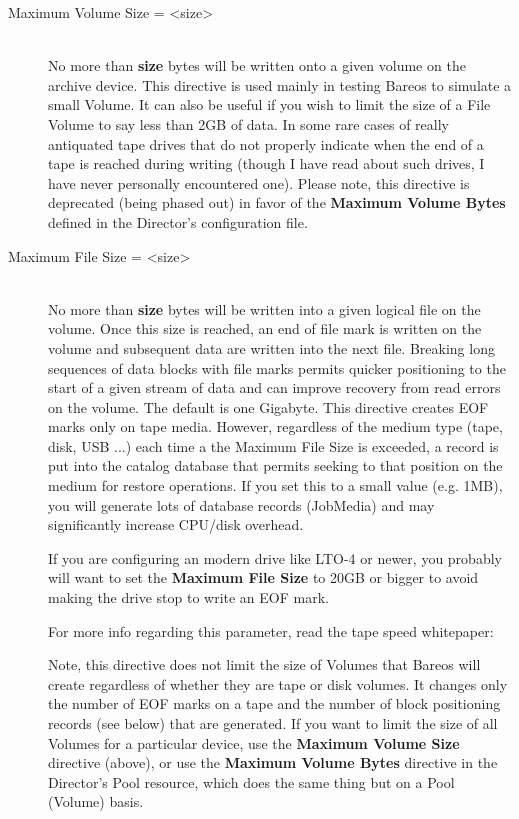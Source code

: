 \begin{description}
\item [Maximum Volume Size = {\textless}size{\textgreater}] \hfill \\
No more than {\bf size} bytes will be written onto a given volume on the
archive device.  This directive is used mainly in testing Bareos to
simulate a small Volume.  It can also be useful if you wish to limit the
size of a File Volume to say less than 2GB of data.  In some rare cases
of really antiquated tape drives that do not properly indicate when the
end of a tape is reached during writing (though I have read about such
drives, I have never personally encountered one).  Please note, this
directive is deprecated (being phased out) in favor of the {\bf Maximum
Volume Bytes} defined in the Director's configuration file.

\item [Maximum File Size = {\textless}size{\textgreater}] \hfill \\
No more than {\bf size} bytes will be written into a given logical file
on the volume.  Once this size is reached, an end of file mark is
written on the volume and subsequent data are written into the next
file.  Breaking long sequences of data blocks with file marks permits
quicker positioning to the start of a given stream of data and can
improve recovery from read errors on the volume.  The default is one
Gigabyte.  This directive creates EOF marks only on tape media.
However, regardless of the medium type (tape, disk, USB ...) each time
a the Maximum File Size is exceeded, a record is put into the catalog
database that permits seeking to that position on the medium for
restore operations. If you set this to a small value (e.g. 1MB),
you will generate lots of database records (JobMedia) and may
significantly increase CPU/disk overhead.

If you are configuring an modern drive like LTO-4 or newer, you probably will
want to set the {\bf Maximum File Size} to 20GB or bigger to avoid making
the drive stop to write an EOF mark.

For more info regarding this parameter, read the tape speed whitepaper:

Note, this directive does not limit the size of Volumes that Bareos
will create regardless of whether they are tape or disk volumes. It
changes only the number of EOF marks on a tape and the number of
block positioning records (see below) that are generated. If you
want to limit the size of all Volumes for a particular device, use
the {\bf Maximum Volume Size} directive (above), or use the
{\bf Maximum Volume Bytes} directive in the Director's Pool resource,
which does the same thing but on a Pool (Volume) basis.


\end{description}

